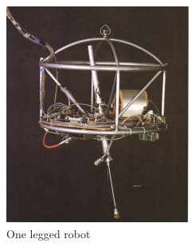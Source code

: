 \documentclass[USenglish]{ifimaster}  %
\begin{document}
\begin{figure}
	\centering
	\begin{subfigure}[b]{0.22\textwidth}
		\centering
		\includegraphics[width=\linewidth]{Figures/Hopper}
		\caption{One legged robot \cite{Raibert:1986:LR:5948.5950}}
		\label{fig:onlegg}
	\end{subfigure}\hfill
	\begin{subfigure}[b]{0.22\textwidth}
		\centering

\end{subfigure}
\end{figure}
\end{document}
